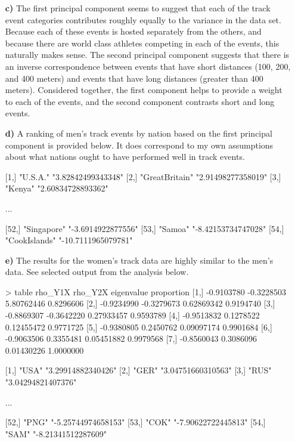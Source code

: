 \begin{enumerate}
\item[\bf{c)}]
	The first principal component seems to suggest that each of the track event categories contributes roughly equally to the variance in the data set. Because each of these events is hosted separately from the others, and because there are world class athletes competing in each of the events, this naturally makes sense. The second principal component suggests that there is an inverse correspondence between events that have short distances (100, 200, and 400 meters) and events that have long distances (greater than 400 meters). Considered together, the first component helps to provide a weight to each of the events, and the second component contrasts short and long events.

\item[\bf{d)}]
	A ranking of men's track events by nation based on the first principal component is provided below. It does correspond to my own assumptions about what nations ought to have performed well in track events.

\begin{rc}

 [1,] "U.S.A."         "3.82842499343348"   
 [2,] "GreatBritain"   "2.91498277358019"   
 [3,] "Kenya"          "2.60834728893362"   

...

[52,] "Singapore"      "-3.6914922877556"   
[53,] "Samoa"          "-8.42153734747028"  
[54,] "CookIslands"    "-10.7111965079781"
\end{rc}

\item[\bf{e)}]
	The results for the women's track data are highly similar to the men's data. See selected output from the analysis below.

\begin{rc}

> table
        rho_Y1X    rho_Y2X eigenvalue proportion
[1,] -0.9103780 -0.3228503 5.80762446  0.8296606
[2,] -0.9234990 -0.3279673 0.62869342  0.9194740
[3,] -0.8869307 -0.3642220 0.27933457  0.9593789
[4,] -0.9513832  0.1278522 0.12455472  0.9771725
[5,] -0.9380805  0.2450762 0.09097174  0.9901684
[6,] -0.9063506  0.3355481 0.05451882  0.9979568
[7,] -0.8560043  0.3086096 0.01430226  1.0000000

 [1,] "USA"  "3.29914882340426"    
 [2,] "GER"  "3.04751660310563"    
 [3,] "RUS"  "3.04294821407376"   

...

[52,] "PNG"  "-5.25744974658153"   
[53,] "COK"  "-7.90622722445813"   
[54,] "SAM"  "-8.21341512287609"
\end{rc}

\end{enumerate}


